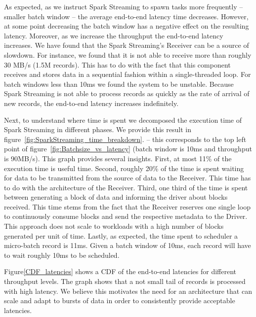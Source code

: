 As expected, as we instruct Spark Streaming to spawn tasks more frequently -- smaller batch window -- the average end-to-end latency time decreases.
However, at some point decreasing the batch window has a negative effect on the resulting latency.
Moreover, as we increase the throughput the end-to-end latency increases.
We have found that the Spark Streaming's Receiver can be a source of slowdown.
For instance, we found that it is not able to receive more than roughly 30 MB/s (1.5M records).
This has to do with the fact that this component receives and stores data in a sequential fashion within a single-threaded loop.
For batch windows less than 10ms we found the system to be unstable. 
Because Spark Streaming is not able to process records as quickly as the rate of arrival of new records, the end-to-end latency increases indefinitely.

Next, to understand where time is spent we decomposed the execution time of Spark Streaming in different phases.
We provide this result in figure~\ref{fig:SparkStreaming_time_breakdown}. 
-- this corresponds to the top left point of figure~\ref{fig:Batchsize_vs_latency} (batch window is 10ms and throughput is 90MB/s).
This graph provides several insights. 
First, at most 11\% of the execution time is useful time.
Second, roughly 20\% of the time is spent waiting for data to be transmitted from the source of data to the Receiver.
This time has to do with the architecture of the Receiver.
Third, one third of the time is spent between generating a block of data and informing the driver about blocks received.
This time stems from the fact that the Receiver reserves one single loop to continuously consume blocks and send the respective metadata to the Driver.
This approach does not scale to workloads with a high number of blocks generated per unit of time.
Lastly, as expected, the time spent to scheduler a micro-batch record is 11ms. Given a batch window of 10ms, each record will have to wait roughly 10ms to be scheduled.

Figure\ref{CDF_latencies} shows a CDF of the end-to-end latencies for different throughput levels. The graph shows that a not small tail of records is processed with high latency.
We believe this motivates the need for an architecture that can scale and adapt to bursts of data in order to consistently provide acceptable latencies.

